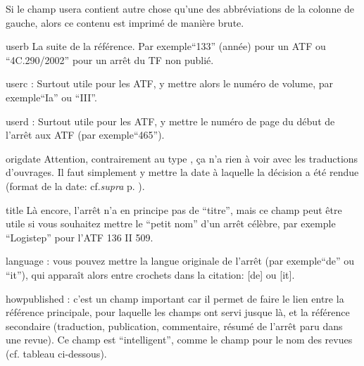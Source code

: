 \documentclass[a4paper]{ltxdockit}[2011/03/25]
\newcommand{\supra}{\emph{supra}\xspace}
\newcommand{\infra}{\emph{infra}\xspace}
\newcommand{\cf}{cf.\xspace}
\newcommand{\GM}{\enquote}
\newcommand{\pex}{\textnormal{par exemple}\xspace}
\newcommand{\Pex}{\textnormal{Par exemple}\xspace}
\begin{document}
\begin{marglist}
Si le champ usera contient autre chose qu'une des abbréviations de la colonne de gauche, alors ce contenu est imprimé de manière brute.

\item[userb]\label{userb} La suite de la référence. \Pex \GM{133} (année) pour un ATF ou \GM{4C.290/2002} pour un arrêt du TF non publié.
\item[userc]\label{userc}: Surtout utile pour les ATF, y mettre alors le numéro de volume, \pex \GM{Ia} ou \GM{III}. 
\item[userd]\label{userd}: Surtout utile pour les ATF, y mettre le numéro de page du début de l'arrêt aux ATF (\pex \GM{465}).
\item[origdate] Attention, contrairement au type , ça n'a rien à voir avec les traductions d'ouvrages. Il faut simplement y mettre la date à laquelle la décision a été rendue (format de la date: \cf \supra p. \pageref{date}). %
\item[title] Là encore, l'arrêt n'a en principe pas de \GM{titre}, mais ce champ peut être utile si vous souhaitez mettre le \GM{petit nom} d'un arrêt célèbre, par exemple \GM{Logistep} pour l'ATF 136 II 509.
\item[language]\label{language}: vous pouvez mettre la langue originale de l'arrêt (\pex \GM{de} ou \GM{it}), qui apparaît alors entre crochets dans la citation: [de] ou [it].
\item[howpublished]\label{howpublished}: c'est un champ important car il permet de faire le lien entre la référence principale, pour laquelle les champs ont servi jusque là, et la référence secondaire (traduction, publication, commentaire, résumé de l'arrêt paru dans une revue). Ce champ est \GM{intelligent}, comme le champ  pour le nom des revues (\cf tableau ci-dessous).


\end{marglist}
\end{document}
